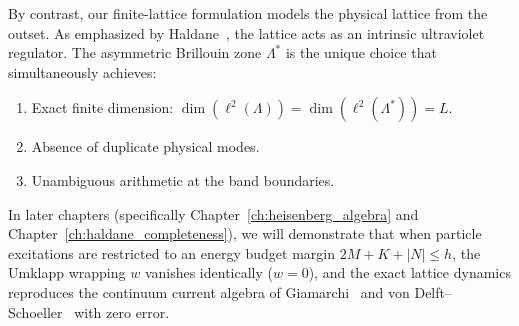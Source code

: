By contrast, our finite-lattice formulation models the physical lattice from the outset. As emphasized by Haldane~\cite{haldane1981}, the lattice acts as an intrinsic ultraviolet regulator. The asymmetric Brillouin zone $\Lambda^*$ is the unique choice that simultaneously achieves:
\begin{enumerate}
    \item Exact finite dimension: $\dim(\ell^2(\Lambda)) = \dim(\ell^2(\Lambda^*)) = L$.
    \item Absence of duplicate physical modes.
    \item Unambiguous arithmetic at the band boundaries.
\end{enumerate}
In later chapters (specifically Chapter~\ref{ch:heisenberg_algebra} and Chapter~\ref{ch:haldane_completeness}), we will demonstrate that when particle excitations are restricted to an energy budget margin $2M + K + |N| \le h$, the Umklapp wrapping $w$ vanishes identically ($w = 0$), and the exact lattice dynamics reproduces the continuum current algebra of Giamarchi~\cite{giamarchi2004} and von Delft--Schoeller~\cite{vondelft1998} with zero error.
